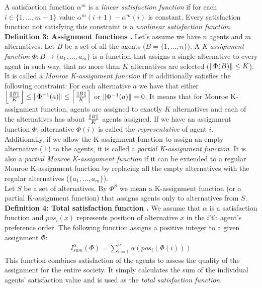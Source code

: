 A satisfaction function  $\alpha^{m}$ is a \textit{linear satisfaction function} if for each $i \in \{1,...,m-1\}$ value $\alpha^{m}(i+1) - \alpha^{m}(i)$ is constant. Every satisfaction function not satisfying this constraint is a \textit{nonlinear satisfaction function}.
\\

\noindent
\textbf{Definition 3: Assignment functions \cite{1}.} \hspace{.1in} Let's assume we have $n$ agents and $m$ alternatives. Let $B$ be a set of all the agents ($B = \{1,...,n\}$). A \textit{K-assignment function} $\Phi: B \rightarrow \{a_{1},...,a_{m}\}$ is a function that assigns a single alternative to every agent in such way, that no more than $K$ alternatives are selected ($\lVert\Phi(B)\rVert \leq K$). It is called a \textit{Monroe K-assignment function} if it additionally satisfies the following constraint: For each alternative $a$ we have that either $\left\lfloor \frac{\lVert B\rVert}{K} \right\rfloor \leq \lVert\Phi^{-1}(a)\rVert \leq \left\lceil \frac{\lVert B\rVert}{K} \right\rceil$ or $\lVert\Phi^{-1}(a)\rVert = 0$. It means that for Monroe K-assignment function, agents are assigned to exactly $K$ alternatives and each of the alternatives has about $\frac{\lVert B\rVert}{K}$ agents assigned. If we have an assignment function $\Phi$, alternative $\Phi(i)$ is called the \textit{representative} of agent $i$.
\\

Additionally, if we allow the K-assignment function to assign an empty alternative ($\bot$) to the agents, it is called a \textit{partial K-assignment function}. It is also a \textit{partial Monroe K-assignment function} if it can be extended to a regular Monroe K-assignment function by replacing all the empty alternatives with the regular alternatives ($\{a_{1},...,a_{m}\}$).
\\

Let $S$ be a set of alternatives. By $\Phi^{S}$ we mean a K-assignment function (or a partial K-assignment function) that assigns agents only to alternatives from $S$.
\\

\noindent
\textbf{Definition 4: Total satisfaction function \cite{1}.} \hspace{.1in} We assume that $\alpha$ is a satisfaction function and $pos_{i}(x)$ represents position of alternative $x$ in the $i$'th agent's preference order. The following function assigns a positive integer to a given assignment $\Phi$:
\begin{gather}
	l^{\alpha}_{sum}(\Phi) = \sum^{n}_{i=1} \alpha (pos_{i}(\Phi(i)))
\end{gather}
This function combines satisfaction of the agents to assess the quality of the assignment for the entire society. It simply calculates the sum of the individual agents' satisfaction value and is used as the \textit{total satisfaction function}.
\\


